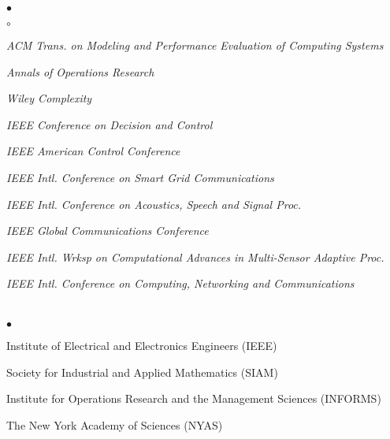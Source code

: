 \documentclass[margin,line]{res}
\newenvironment{list2}{
  \begin{list}{$\bullet$}{%
      \setlength{\itemsep}{0in}
      \setlength{\parsep}{0in} \setlength{\parskip}{0in}
      \setlength{\topsep}{0in} \setlength{\partopsep}{0in}
      \setlength{\leftmargin}{0.10in}}}{\end{list}}
\newenvironment{list3}{
  \begin{list}{$\circ$}{%
      \setlength{\itemsep}{0in}
      \setlength{\parsep}{0in} \setlength{\parskip}{0in}
      \setlength{\topsep}{0in} \setlength{\partopsep}{0in}
      \setlength{\leftmargin}{0.28in}}}{\end{list}}
\begin{document}
\begin{resume}
\begin{list2}
\begin{list3}
\item \emph{ACM Trans. on Modeling and Performance Evaluation of Computing Systems}
\item \emph{Annals of Operations Research} 
\item \emph{Wiley Complexity}
\item \emph{IEEE Conference on Decision and Control}
\item \emph{IEEE American Control Conference}
\item \emph{IEEE Intl. Conference on Smart Grid Communications}
\item \emph{IEEE Intl.  Conference on Acoustics, Speech and Signal Proc.}
\item \emph{IEEE Global Communications Conference}
\item \emph{IEEE Intl.  Wrksp on Computational Advances in Multi-Sensor Adaptive Proc.}
\item \emph{IEEE Intl.  Conference on Computing, Networking and Communications} 
\end{list3}

\end{list2}
%


\vspace{0.4cm}

\section{}

\begin{list2}
\item Institute of Electrical and Electronics Engineers (IEEE)
\item Society for Industrial and Applied Mathematics (SIAM)
\item Institute for Operations Research and the Management Sciences (INFORMS)
\item The New York Academy of Sciences (NYAS)
\end{list2}

\vspace{0.4cm}

%



\end{resume}
\end{document}

